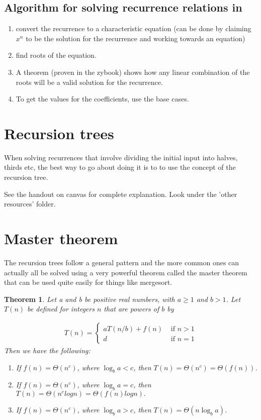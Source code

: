\documentclass[12pt]{article}
\newtheorem{theorem}{Theorem}
\begin{document}
\subsection*{Algorithm for solving recurrence relations in}

\begin{enumerate}
\item convert the recurrence to a characteristic equation (can be done by claiming $x^n$ to be the solution for the recurrence and working towards an equation)
\item find roots of the equation.
\item A theorem (proven in the zybook) shows how any linear combination of the roots will be a valid solution for the recurrence.
\item To get the values for the coefficients, use the base cases.
\end{enumerate}

\section*{Recursion trees}

When solving recurrences that involve dividing the initial input into halves, thirds etc, the best way to go about doing it is to to use the concept of the recursion tree.

See the handout on canvas for complete explanation. Look under the 'other resources' folder.

\section*{Master theorem}
The recursion trees follow a general pattern and the more common ones can actually all be solved using a very powerful theorem called the master theorem that can be used quite easily for things like mergesort.

\begin{theorem}

Let a and b be positive real numbers, with $a \ge 1$
and $b > 1$. Let $T(n)$ be defined for integers $n$ that are powers of $b$ by

\begin{align*}
T(n) = \begin{cases}
aT(n/b) + f(n) &\mbox{ if } n > 1 \\
d &\mbox{ if } n = 1
\end{cases}
\end{align*}
Then we have the following:

\begin{enumerate}
\item If $f(n) = \Theta(n^c )$, where $\log_b a < c$, then
$T(n) = \Theta(n^c ) = \Theta (f(n))$.
\item If $f(n) = \Theta(n^c )$, where $\log_b a = c$, then
$T(n) = \Theta(n^c logn) = \Theta (f(n)logn ).$
\item  If $f(n) = \Theta(n^c )$, where $\log_b a > c$, then $T(n) = \Theta(n \log_b a )$.

\end{enumerate}


\end{theorem}
\end{document}
